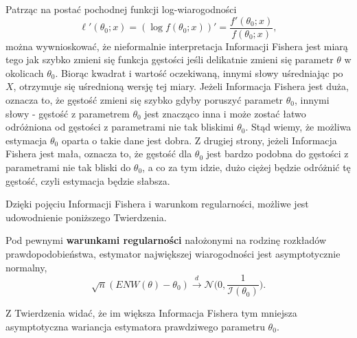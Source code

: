 \newpage
Patrząc na postać pochodnej funkcji log-wiarogodności
$$\ell'(\theta_0;x) = (\log f(\theta_0;x))' = \dfrac{f'(\theta_0;x)}{f(\theta_0;x)},$$
można wywnioskować, że nieformalnie interpretacja Informacji Fishera jest miarą tego jak szybko zmieni się funkcja gęstości jeśli delikatnie zmieni się parametr $\theta$ w okolicach $\theta_0$. Biorąc kwadrat i wartość oczekiwaną, innymi słowy uśredniając po $X$, otrzymuje się uśrednioną wersję tej miary. Jeżeli Informacja Fishera jest duża, oznacza to, że gęstość zmieni się szybko
gdyby poruszyć parametr $\theta_0$, innymi słowy - gęstość z parametrem $\theta_0$ jest
znacząco inna i może zostać łatwo odróżniona od gęstości z parametrami nie tak bliskimi $\theta_0$.
Stąd wiemy, że możliwa estymacja $\theta_0$ oparta o takie dane jest dobra. Z drugiej strony, jeżeli
Informacja Fishera jest mała, oznacza to, że gęstość dla $\theta_0$ jest bardzo podobna do gęstości z parametrami nie tak bliski do $\theta_0$, a co za tym idzie, dużo ciężej będzie odróżnić tę gęstość, czyli estymacja będzie słabsza.

Dzięki pojęciu Informacji Fishera i warunkom regularności, możliwe jest udowodnienie poniższego Twierdzenia.

\begin{theorem}
Pod pewnymi \textbf{warunkami regularności} nałożonymi na rodzinę rozkładów prawdopodobieństwa, estymator największej wiarogodności jest asymptotycznie normalny, 
$$ \sqrt{n}(ENW(\theta) - \theta_0) \overset{d}{\rightarrow} \mathcal{N}\Big(0, \dfrac{1}{\mathcal{I}(\theta_0)}\Big).$$
\end{theorem}

Z Twierdzenia widać, że im większa Informacja Fishera tym mniejsza asymptotyczna wariancja estymatora prawdziwego parametru $\theta_0$.

